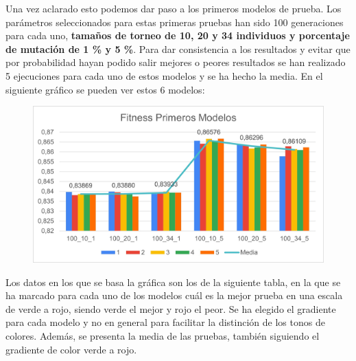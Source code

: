 \documentclass[12pt, spanish, pdftex]{UC3M_document}
\begin{document}
Una vez aclarado esto podemos dar paso a los primeros modelos de prueba. Los parámetros seleccionados para estas primeras pruebas han sido 100 generaciones para cada uno, \textbf{tamaños de torneo de 10, 20 y 34 individuos y porcentaje de mutación de 1 \% y 5 \%}. Para dar consistencia a los resultados y evitar que por probabilidad hayan podido salir mejores o peores resultados se han realizado 5 ejecuciones para cada uno de estos modelos y se ha hecho la media. En el siguiente gráfico se pueden ver estos 6 modelos:
\begin{figure}[H]
	{\includegraphics[scale=.8]{./img/first_models.jpg}}
\end{figure}
Los datos en los que se basa la gráfica son los de la siguiente tabla, en la que se ha marcado para cada uno de los modelos cuál es la mejor prueba en una escala de verde a rojo, siendo verde el mejor y rojo el peor. Se ha elegido el gradiente para cada modelo y no en general para facilitar la distinción de los tonos de colores. Además, se presenta la media de las pruebas, también siguiendo el gradiente de color verde a rojo.
\end{document}
